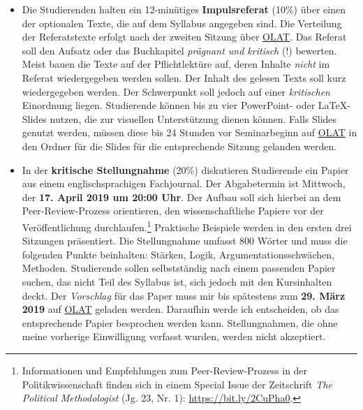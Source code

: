 \documentclass[abstract=on,parskip=full,headings=standardclasses,fontsize=11pt,paper=a4]{scrartcl}
\begin{document}
\begin{itemize}
\item Die Studierenden halten ein 12-minütiges \textbf{Impulsreferat} (10\%)  über einen der optionalen Texte, die auf dem Syllabus angegeben sind. Die Verteilung der Referatstexte erfolgt nach der zweiten Sitzung über \href{https://lms.uzh.ch/url/RepositoryEntry/16539681116?guest=true&lang=en}{OLAT}. Das Referat soll den Aufsatz oder das Buchkapitel \textit{prägnant und kritisch} (!) bewerten. Meist bauen die Texte auf der Pflichtlektüre auf, deren Inhalte \textit{nicht} im Referat wiedergegeben werden sollen. Der Inhalt des gelesen Texts soll kurz wiedergegeben werden. Der Schwerpunkt  soll jedoch auf einer \textit{kritischen} Einordnung liegen.  Studierende können bis zu vier PowerPoint- oder LaTeX-Slides nutzen, die zur visuellen Unterstützung dienen können. Falls Slides genutzt werden, müssen diese bis 24 Stunden vor Seminarbeginn auf \href{https://lms.uzh.ch/url/RepositoryEntry/16539681116?guest=true&lang=en}{OLAT} in den Ordner für die Slides für die entsprechende Sitzung gelanden werden. 

\item In der \textbf{kritische Stellungnahme} (20\%) diskutieren Studierende ein Papier aus einem englischsprachigen Fachjournal. Der Abgabetermin ist Mittwoch, der \textbf{17. April 2019 um 20:00 Uhr}.   Der Aufbau soll sich hierbei an dem Peer-Review-Prozess orientieren, den wissenschaftliche Papiere vor der Veröffentlichung durchlaufen.\footnote{Informationen und Empfehlungen zum Peer-Review-Prozess in der Politikwissenschaft finden sich in einem Special Issue der Zeitschrift \textit{The Political Methodologist}  (Jg. 23, Nr. 1): \url{https://bit.ly/2CuPha0}.} Praktische Beispiele werden in den ersten drei Sitzungen präsentiert. Die Stellungnahme umfasst 800 Wörter und  muss die folgenden Punkte beinhalten: Stärken, Logik, Argumentationsschwächen, Methoden. Studierende sollen selbstständig nach einem passenden Papier suchen, das nicht Teil des Syllabus ist, sich jedoch  mit den Kursinhalten deckt. Der \textit{Vorschlag} für das Paper muss mir bis spätestens zum \textbf{29. März 2019}  auf \href{https://lms.uzh.ch/url/RepositoryEntry/16539681116?guest=true&lang=en}{OLAT} geladen werden. Daraufhin werde ich entscheiden, ob das entsprechende Papier besprochen werden kann. Stellungnahmen, die ohne meine vorherige Einwilligung verfasst wurden, werden nicht akzeptiert. 



\end{itemize}
\end{document}
